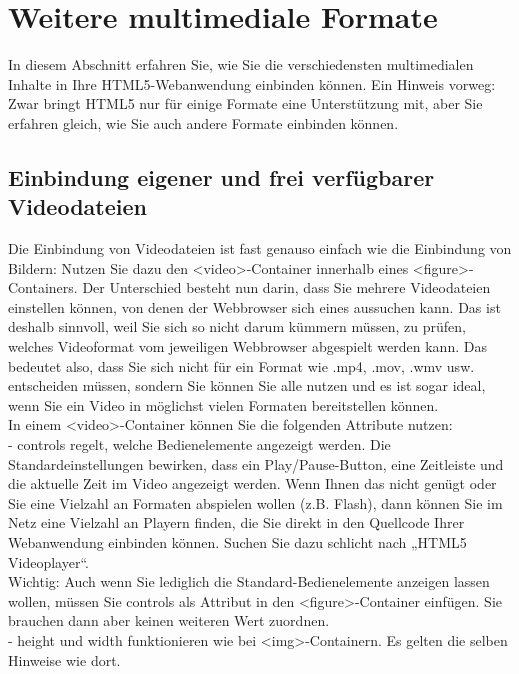 \section{Weitere multimediale Formate}

In diesem Abschnitt erfahren Sie, wie Sie die verschiedensten multimedialen Inhalte in Ihre HTML5-Webanwendung einbinden können. Ein Hinweis vorweg: Zwar bringt HTML5 nur für einige Formate eine Unterstützung mit, aber Sie erfahren gleich, wie Sie auch andere Formate einbinden können.

\subsection{Einbindung eigener und frei verfügbarer Videodateien}

Die Einbindung von Videodateien ist fast genauso einfach wie die Einbindung von Bildern: Nutzen Sie dazu den <video>-Container innerhalb eines <figure>-Containers. Der Unterschied besteht nun darin, dass Sie mehrere Videodateien einstellen können, von denen der Webbrowser sich eines aussuchen kann. Das ist deshalb sinnvoll, weil Sie sich so nicht darum kümmern müssen, zu prüfen, welches Videoformat vom jeweiligen Webbrowser abgespielt werden kann. Das bedeutet also, dass Sie sich nicht für ein Format wie .mp4, .mov, .wmv usw. entscheiden müssen, sondern Sie können Sie alle nutzen und es ist sogar ideal, wenn Sie ein Video in möglichst vielen Formaten bereitstellen können.\\

In einem <video>-Container können Sie die folgenden Attribute nutzen:\\

-	controls regelt, welche Bedienelemente angezeigt werden. Die Standardeinstellungen bewirken, dass ein Play/Pause-Button, eine Zeitleiste und die aktuelle Zeit im Video angezeigt werden. Wenn Ihnen das nicht genügt oder Sie eine Vielzahl an Formaten abspielen wollen (z.B. Flash), dann können Sie im Netz eine Vielzahl an Playern finden, die Sie direkt in den Quellcode Ihrer Webanwendung einbinden können. Suchen Sie dazu schlicht nach „HTML5 Videoplayer“.\\

Wichtig: Auch wenn Sie lediglich die Standard-Bedienelemente anzeigen lassen wollen, müssen Sie controls als Attribut in den <figure>-Container einfügen. Sie brauchen dann aber keinen weiteren Wert zuordnen.\\

-	height und width funktionieren wie bei <img>-Containern. Es gelten die selben Hinweise wie dort.

